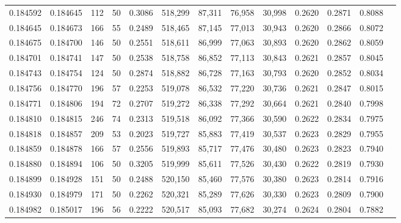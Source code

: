 \begin{tabular}{rrrrrrrrrrrrr}
0.184592 & 0.184645 &   112 &  50 &                                     0.3086 & 518,299 &  87,311 &  76,958 &  30,998 & 0.2620 & 0.2871 & 0.8088 \\
0.184645 & 0.184673 &   166 &  55 &                                     0.2489 & 518,465 &  87,145 &  77,013 &  30,943 & 0.2620 & 0.2866 & 0.8072 \\
0.184675 & 0.184700 &   146 &  50 &                                     0.2551 & 518,611 &  86,999 &  77,063 &  30,893 & 0.2620 & 0.2862 & 0.8059 \\
0.184701 & 0.184741 &   147 &  50 &                                     0.2538 & 518,758 &  86,852 &  77,113 &  30,843 & 0.2621 & 0.2857 & 0.8045 \\
0.184743 & 0.184754 &   124 &  50 &                                     0.2874 & 518,882 &  86,728 &  77,163 &  30,793 & 0.2620 & 0.2852 & 0.8034 \\
0.184756 & 0.184770 &   196 &  57 &                                     0.2253 & 519,078 &  86,532 &  77,220 &  30,736 & 0.2621 & 0.2847 & 0.8015 \\
0.184771 & 0.184806 &   194 &  72 &                                     0.2707 & 519,272 &  86,338 &  77,292 &  30,664 & 0.2621 & 0.2840 & 0.7998 \\
0.184810 & 0.184815 &   246 &  74 &                                     0.2313 & 519,518 &  86,092 &  77,366 &  30,590 & 0.2622 & 0.2834 & 0.7975 \\
0.184818 & 0.184857 &   209 &  53 &                                     0.2023 & 519,727 &  85,883 &  77,419 &  30,537 & 0.2623 & 0.2829 & 0.7955 \\
0.184859 & 0.184878 &   166 &  57 &                                     0.2556 & 519,893 &  85,717 &  77,476 &  30,480 & 0.2623 & 0.2823 & 0.7940 \\
0.184880 & 0.184894 &   106 &  50 &                                     0.3205 & 519,999 &  85,611 &  77,526 &  30,430 & 0.2622 & 0.2819 & 0.7930 \\
0.184899 & 0.184928 &   151 &  50 &                                     0.2488 & 520,150 &  85,460 &  77,576 &  30,380 & 0.2623 & 0.2814 & 0.7916 \\
0.184930 & 0.184979 &   171 &  50 &                                     0.2262 & 520,321 &  85,289 &  77,626 &  30,330 & 0.2623 & 0.2809 & 0.7900 \\
0.184982 & 0.185017 &   196 &  56 &                                     0.2222 & 520,517 &  85,093 &  77,682 &  30,274 & 0.2624 & 0.2804 & 0.7882 \\

\end{tabular}
